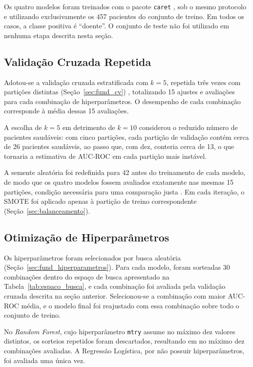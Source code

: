 Os quatro modelos foram treinados com o pacote \texttt{caret} \cite{Kuhn2008Building}, sob o mesmo protocolo e utilizando exclusivamente os 457 pacientes do conjunto de treino. Em todos os casos, a classe positiva é ``doente''. O conjunto de teste não foi utilizado em nenhuma etapa descrita nesta seção.

\subsection{Validação Cruzada Repetida}
\label{sec:validacao_cruzada}

Adotou-se a validação cruzada estratificada com $k = 5$, repetida três vezes com partições distintas (Seção~\ref{sec:fund_cv}) \cite{elementsofstatiscal, Kim2009Estimating}, totalizando 15 ajustes e avaliações para cada combinação de hiperparâmetros. O desempenho de cada combinação corresponde à média dessas 15 avaliações.

A escolha de $k = 5$ em detrimento de $k = 10$ considerou o reduzido número de pacientes saudáveis: com cinco partições, cada partição de validação contém cerca de 26 pacientes saudáveis, ao passo que, com dez, conteria cerca de 13, o que tornaria a estimativa de AUC-ROC em cada partição mais instável.

A semente aleatória foi redefinida para 42 antes do treinamento de cada modelo, de modo que os quatro modelos fossem avaliados exatamente nas mesmas 15 partições, condição necessária para uma comparação justa \cite{Pineau2020Improving}. Em cada iteração, o SMOTE foi aplicado apenas à partição de treino correspondente (Seção~\ref{sec:balanceamento}).

\subsection{Otimização de Hiperparâmetros}
\label{sec:otimizacao_hiperparametros}

Os hiperparâmetros foram selecionados por busca aleatória \cite{Bergstra2012Random} (Seção~\ref{sec:fund_hiperparametros}). Para cada modelo, foram sorteadas 30 combinações dentro do espaço de busca apresentado na Tabela~\ref{tab:espaco_busca}, e cada combinação foi avaliada pela validação cruzada descrita na seção anterior. Selecionou-se a combinação com maior AUC-ROC média, e o modelo final foi reajustado com essa combinação sobre todo o conjunto de treino.

No \textit{Random Forest}, cujo hiperparâmetro \texttt{mtry} assume no máximo dez valores distintos, os sorteios repetidos foram descartados, resultando em no máximo dez combinações avaliadas. A Regressão Logística, por não possuir hiperparâmetros, foi avaliada uma única vez.

